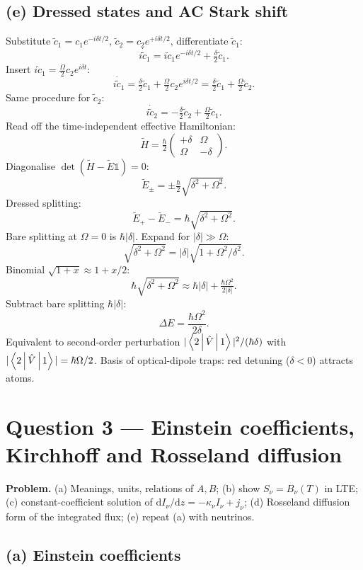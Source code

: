 \documentclass[11pt]{article}
\newcommand{\de}{\mathrm{d}}
\begin{document}
\subsection*{(e) Dressed states and AC Stark shift}

Substitute $\tilde c_1=c_1 e^{-i\delta t/2}$, $\tilde c_2=c_2 e^{+i\delta t/2}$, differentiate $\tilde c_1$:
\[
i\dot{\tilde c}_1=i\dot c_1 e^{-i\delta t/2}+\tfrac{\delta}{2}\tilde c_1.
\]
Insert $i\dot c_1=\tfrac{\Omega}{2}c_2 e^{i\delta t}$:
\[
i\dot{\tilde c}_1=\tfrac{\delta}{2}\tilde c_1+\tfrac{\Omega}{2}c_2 e^{i\delta t/2}=\tfrac{\delta}{2}\tilde c_1+\tfrac{\Omega}{2}\tilde c_2.
\]
Same procedure for $\tilde c_2$:
\[
i\dot{\tilde c}_2=-\tfrac{\delta}{2}\tilde c_2+\tfrac{\Omega}{2}\tilde c_1.
\]
Read off the time-independent effective Hamiltonian:
\[
\tilde H=\tfrac{\hbar}{2}\begin{pmatrix}+\delta&\Omega\\\Omega&-\delta\end{pmatrix}.
\]
Diagonalise $\det(\tilde H-\tilde E\mathbb 1)=0$:
\[
\tilde E_\pm=\pm\tfrac{\hbar}{2}\sqrt{\delta^2+\Omega^2}.
\]
Dressed splitting:
\[
\tilde E_+-\tilde E_-=\hbar\sqrt{\delta^2+\Omega^2}.
\]
Bare splitting at $\Omega=0$ is $\hbar|\delta|$. Expand for $|\delta|\gg\Omega$:
\[
\sqrt{\delta^2+\Omega^2}=|\delta|\sqrt{1+\Omega^2/\delta^2}.
\]
Binomial $\sqrt{1+x}\approx 1+x/2$:
\[
\hbar\sqrt{\delta^2+\Omega^2}\approx\hbar|\delta|+\tfrac{\hbar\Omega^2}{2|\delta|}.
\]
Subtract bare splitting $\hbar|\delta|$:
\begin{equation}
\boxed{\;\Delta E=\frac{\hbar\Omega^2}{2\delta}.\;}
\label{eq:ACStark}
\end{equation}
Equivalent to second-order perturbation $|\Braket{2|\hat V|1}|^2/(\hbar\delta)$ with $|\Braket{2|\hat V|1}|=\hbar\Omega/2$. Basis of optical-dipole traps: red detuning ($\delta<0$) attracts atoms.

\section*{Question 3 --- Einstein coefficients, Kirchhoff and Rosseland diffusion}

\textbf{Problem.} (a) Meanings, units, relations of $A,B$; (b) show $S_\nu=B_\nu(T)$ in LTE; (c) constant-coefficient solution of $\de I_\nu/\de z=-\kappa_\nu I_\nu+j_\nu$; (d) Rosseland diffusion form of the integrated flux; (e) repeat (a) with neutrinos.

\subsection*{(a) Einstein coefficients}
\end{document}
